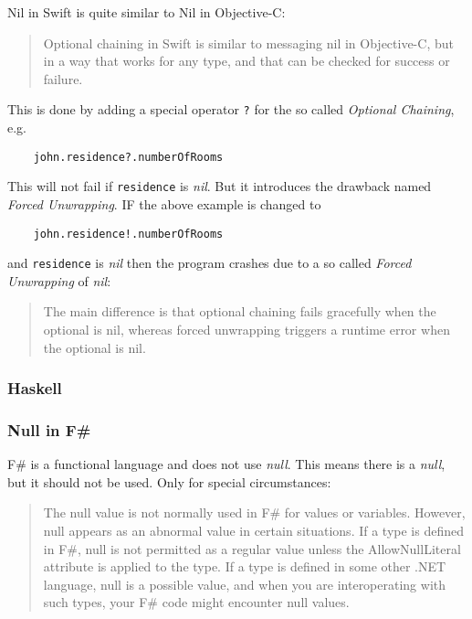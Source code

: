 \documentclass[a4paper,12pt]{report}
\begin{document}
Nil in Swift is quite similar to Nil in Objective-C:

\begin{quotation}
    Optional chaining in Swift is similar to messaging nil in Objective-C, but in a way that works for any type, and that can be checked for success or failure.\cite{swift-spec-optional-chaining}
\end{quotation}

This is done by adding a special operator \verb|?| for the so called \textit{Optional Chaining}, e.g.

\begin{verbatim}
    john.residence?.numberOfRooms
\end{verbatim}

This will not fail if \verb|residence| is \textit{nil}. But it introduces the drawback named \textit{Forced Unwrapping}. IF the above example is changed to

\begin{verbatim}
    john.residence!.numberOfRooms
\end{verbatim}

and \verb|residence| is \textit{nil} then the program crashes due to a so called \textit{Forced Unwrapping} of \textit{nil}:

\begin{quotation}
    The main difference is that optional chaining fails gracefully when the optional is nil, whereas forced unwrapping triggers a runtime error when the optional is nil.\cite{swift-spec-optional-chaining}
\end{quotation}

\subsubsection{Haskell}

\subsubsection{Null in F\#}

F\# is a functional language and does not use \textit{null}. This means there is a \textit{null}, but it should not be used. Only for special circumstances:

\begin{quotation}
    The null value is not normally used in F\# for values or variables. However, null appears as an abnormal value in certain situations. If a type is defined in F\#, null is not permitted as a regular value unless the AllowNullLiteral attribute is applied to the type. If a type is defined in some other .NET language, null is a possible value, and when you are interoperating with such types, your F\# code might encounter null values.\cite{null-in-fsharp}
\end{quotation}
\end{document}
